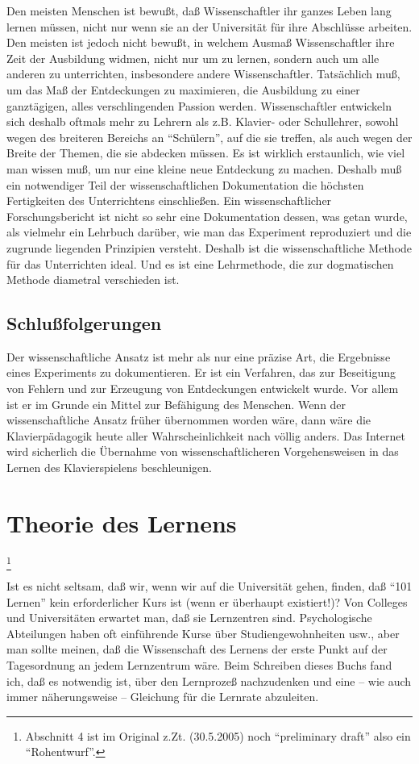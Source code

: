 Den meisten Menschen ist bewußt, daß Wissenschaftler ihr ganzes Leben lang lernen müssen, nicht nur wenn sie an der Universität für ihre Abschlüsse arbeiten.
Den meisten ist jedoch nicht bewußt, in welchem Ausmaß Wissenschaftler ihre Zeit der Ausbildung widmen, nicht nur um zu lernen, sondern auch um alle anderen zu unterrichten, insbesondere andere Wissenschaftler.
Tatsächlich muß, um das Maß der Entdeckungen zu maximieren, die Ausbildung zu einer ganztägigen, alles verschlingenden Passion werden.
Wissenschaftler entwickeln sich deshalb oftmals mehr zu Lehrern als z.B. Klavier- oder Schullehrer, sowohl wegen des breiteren Bereichs an \enquote{Schülern}, auf die sie treffen, als auch wegen der Breite der Themen, die sie abdecken müssen.
Es ist wirklich erstaunlich, wie viel man wissen muß, um nur eine kleine neue Entdeckung zu machen.
Deshalb muß ein notwendiger Teil der wissenschaftlichen Dokumentation die höchsten Fertigkeiten des Unterrichtens einschließen.
Ein wissenschaftlicher Forschungsbericht ist nicht so sehr eine Dokumentation dessen, was getan wurde, als vielmehr ein Lehrbuch darüber, wie man das Experiment reproduziert und die zugrunde liegenden Prinzipien versteht.
Deshalb ist die wissenschaftliche Methode für das Unterrichten ideal.
Und es ist eine Lehrmethode, die zur dogmatischen Methode diametral verschieden ist.


\subsection{Schlußfolgerungen}
\label{c3_3h}

Der wissenschaftliche Ansatz ist mehr als nur eine präzise Art, die Ergebnisse eines Experiments zu dokumentieren.
Er ist ein Verfahren, das zur Beseitigung von Fehlern und zur Erzeugung von Entdeckungen entwickelt wurde.
Vor allem ist er im Grunde ein Mittel zur Befähigung des Menschen.
Wenn der wissenschaftliche Ansatz früher übernommen worden wäre, dann wäre die Klavierpädagogik heute aller Wahrscheinlichkeit nach völlig anders.
Das Internet wird sicherlich die Übernahme von wissenschaftlicheren Vorgehensweisen in das Lernen des Klavierspielens beschleunigen.
 

\section{Theorie des Lernens}
\label{c3_4}

\footnote{Abschnitt 4 ist im Original z.Zt. (30.5.2005) noch \enquote{preliminary draft} also ein \enquote{Rohentwurf}.}

Ist es nicht seltsam, daß wir, wenn wir auf die Universität gehen, finden, daß \enquote{101 Lernen} kein erforderlicher Kurs ist (wenn er überhaupt existiert!)?
Von Colleges und Universitäten erwartet man, daß sie Lernzentren sind.
Psychologische Abteilungen haben oft einführende Kurse über Studiengewohnheiten usw., aber man sollte meinen, daß die Wissenschaft des Lernens der erste Punkt auf der Tagesordnung an jedem Lernzentrum wäre.
Beim Schreiben dieses Buchs fand ich, daß es notwendig ist, über den Lernprozeß nachzudenken und eine -- wie auch immer näherungsweise -- Gleichung für die Lernrate abzuleiten.
 



